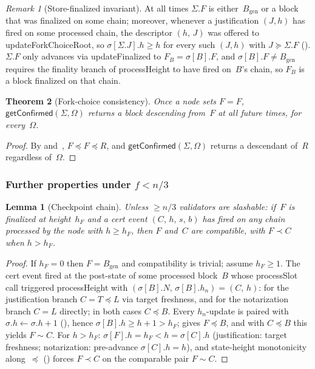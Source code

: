 \documentclass{article}
\newcommand{\genesis}{\ensuremath{B_{\mathrm{gen}}}}
\newcommand{\processSlot}{\textsf{processSlot}\xspace}
\newcommand{\processHeight}{\textsf{processHeight}\xspace}
\newcommand{\updateForkChoiceRoot}{\textsf{updateForkChoiceRoot}\xspace}
\newcommand{\updateFinalized}{\textsf{updateFinalized}\xspace}
\newcommand{\getConfirmed}{\textsf{getConfirmed}\xspace}
\theoremstyle{plain}
\newtheorem{theorem}{Theorem}
\newtheorem{lemma}{Lemma}
\theoremstyle{definition}
\theoremstyle{remark}
\newtheorem{remark}[theorem]{Remark}
\begin{document}
\begin{remark}[Store-finalized invariant]\label{rem:fs-invariant}
At all times $\Sigma.F$ is either~$\genesis$ or a block that was finalized on some chain; moreover, whenever a justification $(J, h)$ has fired on some processed chain, the descriptor $(h,\, J)$ was offered to \updateForkChoiceRoot, so $\sigma[\Sigma.J].h \geq h$ for every such $(J, h)$ with $J \succeq \Sigma.F$ ().
$\Sigma.F$ only advances via \updateFinalized to $F_B = \sigma[B].F$, and $\sigma[B].F \neq \genesis$ requires the finality branch of \processHeight to have fired on~$B$'s chain, so $F_B$ is a block finalized on that chain.
\end{remark}

\begin{theorem}[Fork-choice consistency]\label{thm:fcconsistency}
Once a node sets $F = F$, $\getConfirmed(\Sigma, \Omega)$ returns a block descending from~$F$ at all future times, for every~$\Omega$.
\end{theorem}

\begin{proof}
By  and~, $F \preceq F \preceq R$, and $\getConfirmed(\Sigma, \Omega)$ returns a descendant of~$R$ regardless of~$\Omega$.
\end{proof}

\subsubsection*{Further properties under $f < n/3$}

\begin{lemma}[Checkpoint chain]\label{lem:certchain}
Unless $\geq n/3$ validators are slashable: if~$F$ is finalized at height~$h_F$ and a cert event $(C,\, h,\, s,\, b)$ has fired on any chain processed by the node with $h \geq h_F$, then $F$ and~$C$ are compatible, with $F \prec C$ when $h > h_F$.
\end{lemma}

\begin{proof}
If $h_F = 0$ then $F = \genesis$ and compatibility is trivial; assume $h_F \geq 1$.
The cert event fired at the post-state of some processed block~$B$ whose \processSlot call triggered \processHeight with $(\sigma[B].N,\, \sigma[B].h_n) = (C,\, h)$: for the justification branch $C = T \preceq L$ via target freshness, and for the notarization branch $C = L$ directly; in both cases $C \preceq B$.
Every $h_n$-update is paired with $\sigma.h \gets \sigma.h + 1$ (), hence $\sigma[B].h \geq h + 1 > h_F$;  gives $F \preceq B$, and with $C \preceq B$ this yields $F \sim C$.
For $h > h_F$: $\sigma[F].h = h_F < h = \sigma[C].h$ (justification: target freshness; notarization: pre-advance $\sigma[C].h = h$), and state-height monotonicity along~$\preceq$ () forces $F \prec C$ on the comparable pair $F \sim C$.
\end{proof}
\end{document}
